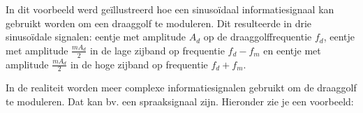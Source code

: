 In dit voorbeeld werd ge\"illustreerd hoe een sinuso\"idaal informatiesignaal kan gebruikt worden om een draaggolf te moduleren. Dit resulteerde in drie sinuso\"idale signalen: eentje met amplitude $A_d$ op de draaggolffrequentie $f_d$, eentje met amplitude $\frac{mA_d}{2}$ in de lage zijband op frequentie $f_d-f_m$ en eentje met amplitude $\frac{mA_d}{2}$ in de hoge zijband op frequentie $f_d+f_m$.

In de realiteit worden meer complexe informatiesignalen gebruikt om de draaggolf te moduleren. Dat kan bv. een spraaksignaal zijn. Hieronder zie je een voorbeeld:


